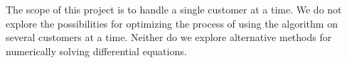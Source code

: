
The scope of this project is to handle a single customer at a time. We do not explore the possibilities for optimizing the process of using the algorithm on several customers at a time. Neither do we explore alternative methods for numerically solving differential equations.